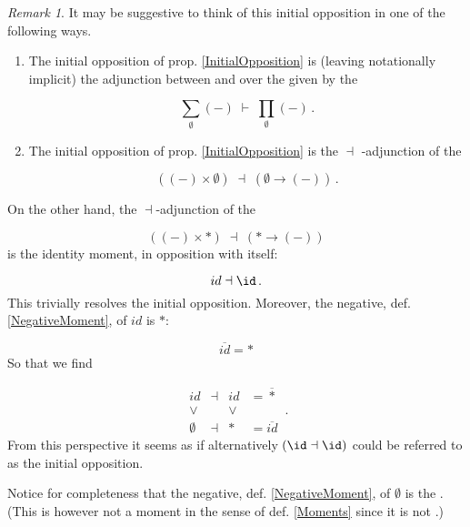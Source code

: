 \documentclass[12pt,titlepage]{article}
\newcommand{\itexarray}[1]{\begin{matrix}#1\end{matrix}}
\theoremstyle{plain}
\theoremstyle{definition}
\theoremstyle{remark}
\newtheorem{remark}{Remark}
\begin{document}
\begin{remark}
\label{AspectsOfTheInitialOpposition}\hypertarget{AspectsOfTheInitialOpposition}{}
It may be suggestive to think of this initial opposition in one of the following ways.

\begin{enumerate}%
\item The initial opposition of prop. \ref{InitialOpposition} is (leaving  notationally implicit) the adjunction between  and  over the  given by the 

\begin{displaymath}
\underset{\emptyset}{\sum}(-)
  \;\vdash\;
  \underset{\emptyset}{\prod}(-)
  \,.
\end{displaymath}

\item The initial opposition of prop. \ref{InitialOpposition} is the  $\dashv$ -adjunction of the 

\begin{displaymath}
\left(
     (-) \times \emptyset
   \right)
   \;\dashv\;
   \left(
     \emptyset \to (-)
   \right)
   \,.
\end{displaymath}


\end{enumerate}
On the other hand, the $\dashv$-adjunction of the 

\begin{displaymath}
\left(
     (-) \times \ast
   \right)
   \;\dashv\;
   \left(
     \ast \to (-)
   \right)
\end{displaymath}
is the identity moment, in opposition with itself:

\begin{displaymath}
id \dashv \id
  \,.
\end{displaymath}
This trivially resolves the initial opposition. Moreover, the negative, def. \ref{NegativeMoment}, of $id$ is $\ast$:

\begin{displaymath}
\overline{id} = \ast
\end{displaymath}
So that we find

\begin{displaymath}
\itexarray{
    id &\dashv& id & = \overline{\ast}
    \\
    \vee && \vee
    \\
    \emptyset &\dashv& \ast & = \overline{id}
  }
  \,.
\end{displaymath}
From this perspective it seems as if alternatively $(\id \dashv \id)$ could be referred to as the initial opposition.

Notice for completeness that the negative, def. \ref{NegativeMoment}, of $\emptyset$ is the . (This is however not a moment in the sense of def. \ref{Moments} since it is not .)

\end{remark}
\end{document}
